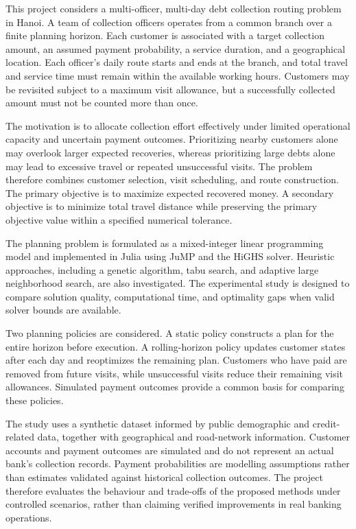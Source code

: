 \documentclass[11pt,a4paper]{article}
\begin{document}
This project considers a multi-officer, multi-day debt collection
routing problem in Hanoi. A team of collection officers operates
from a common branch over a finite planning horizon. Each customer
is associated with a target collection amount, an assumed payment
probability, a service duration, and a geographical location.
Each officer's daily route starts and ends at the branch, and total
travel and service time must remain within the available working
hours. Customers may be revisited subject to a maximum visit
allowance, but a successfully collected amount must not be counted
more than once.

The motivation is to allocate collection effort effectively under
limited operational capacity and uncertain payment outcomes.
Prioritizing nearby customers alone may overlook larger expected
recoveries, whereas prioritizing large debts alone may lead to
excessive travel or repeated unsuccessful visits. The problem
therefore combines customer selection, visit scheduling, and route
construction. The primary objective is to maximize expected
recovered money. A secondary objective is to minimize total travel
distance while preserving the primary objective value within a
specified numerical tolerance.

The planning problem is formulated as a mixed-integer linear
programming model and implemented in Julia using JuMP and the
HiGHS solver. Heuristic approaches, including a genetic algorithm,
tabu search, and adaptive large neighborhood search, are also
investigated. The experimental study is designed to compare
solution quality, computational time, and optimality gaps when
valid solver bounds are available.

Two planning policies are considered. A static policy constructs
a plan for the entire horizon before execution. A rolling-horizon
policy updates customer states after each day and reoptimizes the
remaining plan. Customers who have paid are removed from future
visits, while unsuccessful visits reduce their remaining visit
allowances. Simulated payment outcomes provide a common basis
for comparing these policies.

The study uses a synthetic dataset informed by public demographic
and credit-related data, together with geographical and road-network
information. Customer accounts and payment outcomes are simulated
and do not represent an actual bank's collection records.
Payment probabilities are modelling assumptions rather than
estimates validated against historical collection outcomes.
The project therefore evaluates the behaviour and trade-offs of
the proposed methods under controlled scenarios, rather than
claiming verified improvements in real banking operations.
\end{document}
